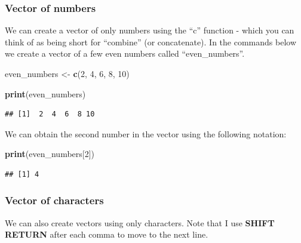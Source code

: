 \documentclass[
]{krantz}
\makeatletter
\newenvironment{Shaded}{\begin{snugshade}}{\end{snugshade}}
\newcommand{\DecValTok}[1]{\textcolor[rgb]{0.06,0.06,0.06}{#1}}
\newcommand{\KeywordTok}[1]{\textcolor[rgb]{0.27,0.27,0.27}{\textbf{#1}}}
\newcommand{\NormalTok}[1]{#1}
\newcommand{\StringTok}[1]{\textcolor[rgb]{0.5,0.5,0.5}{#1}}
\newenvironment{kframe}{%
\medskip{}
\setlength{\fboxsep}{.8em}
 \def\at@end@of@kframe{}%
 \ifinner\ifhmode%
  \def\at@end@of@kframe{\end{minipage}}%
  \begin{minipage}{\columnwidth}%
 \fi\fi%
 \def\FrameCommand##1{\hskip\@totalleftmargin \hskip-\fboxsep
 \colorbox{shadecolor}{##1}\hskip-\fboxsep
     \hskip-\linewidth \hskip-\@totalleftmargin \hskip\columnwidth}%
 \MakeFramed {\advance\hsize-\width
   \@totalleftmargin\z@ \linewidth\hsize
   \@setminipage}}%
 {\par\unskip\endMakeFramed%
 \at@end@of@kframe}
\renewenvironment{Shaded}{\begin{kframe}}{\end{kframe}}
\makeatother
\begin{document}
\hypertarget{vector-of-numbers}{%
\subsubsection{Vector of numbers}\label{vector-of-numbers}}

We can create a vector of only numbers using the ``c'' function - which you can think of as being short for ``combine'' (or concatenate). In the commands below we create a vector of a few even numbers called ``even\_numbers''.

\begin{Shaded}
\begin{Highlighting}[]
\NormalTok{even_numbers <-}\StringTok{ }\KeywordTok{c}\NormalTok{(}\DecValTok{2}\NormalTok{, }\DecValTok{4}\NormalTok{, }\DecValTok{6}\NormalTok{, }\DecValTok{8}\NormalTok{, }\DecValTok{10}\NormalTok{)}
\end{Highlighting}
\end{Shaded}

\begin{Shaded}
\begin{Highlighting}[]
\KeywordTok{print}\NormalTok{(even_numbers)}
\end{Highlighting}
\end{Shaded}

\begin{verbatim}
## [1]  2  4  6  8 10
\end{verbatim}

We can obtain the second number in the vector using the following notation:

\begin{Shaded}
\begin{Highlighting}[]
\KeywordTok{print}\NormalTok{(even_numbers[}\DecValTok{2}\NormalTok{])}
\end{Highlighting}
\end{Shaded}

\begin{verbatim}
## [1] 4
\end{verbatim}

\hypertarget{vector-of-characters}{%
\subsubsection{Vector of characters}\label{vector-of-characters}}

We can also create vectors using only characters. Note that I use \textbf{SHIFT RETURN} after each comma to move to the next line.
\end{document}

